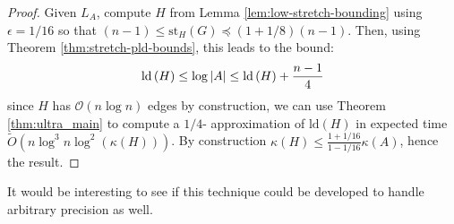 \begin{proof}
Given $L_{A}$, compute $H$ from Lemma \ref{lem:low-stretch-bounding}
using $\epsilon=1/16$ so that $\left(n-1\right)\leq\text{st}_{H}\left(G\right)\preceq\left(1+1/8\right)\left(n-1\right)$.
Then, using Theorem \ref{thm:stretch-pld-bounds}, this leads to the
bound: 
\[
\text{\text{ld}}\left(H\right)\leq\log\left|A\right|\leq\text{ld}\left(H\right)+\frac{n-1}{4}
\]
since $H$ has $\mathcal{O}\left(n\log n\right)$ edges by construction,
we can use Theorem \ref{thm:ultra_main} to compute a $1/4$- approximation
of $\text{ld}\left(H\right)$ in expected time $\tilde{O}\left(n\log^{3}n\log^{2}\left(\kappa(H)\right)\right)$.
By construction $\kappa(H)\leq\frac{1+1/16}{1-1/16}\kappa(A)$, hence
the result. 
\end{proof}
It would be interesting to see if this technique could be developed
to handle arbitrary precision as well. 
